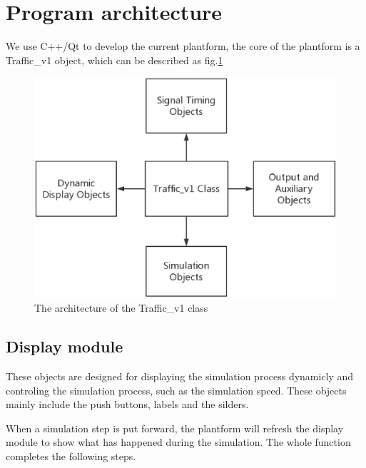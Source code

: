 \documentclass[a4paper]{paper}
\begin{document}
\section{Program architecture}
We use C++/Qt to develop the current plantform, the core of the plantform is a Traffic\_v1 object, which can be described as fig.\ref{UML}

\begin{figure}
\centering
\includegraphics[width=\textwidth]{Diagram.eps}
\caption{The architecture of the Traffic\_v1 class}
\label{UML}
\end{figure}

\subsection{Display module}
These objects are designed for displaying the simulation process dynamicly and controling the simulation process, such as the simulation speed. These objects mainly include the push buttons, labels and the silders.

When a simulation step is put forward, the plantform will refresh the display module to show what has happened during the simulation. The whole function completes the following steps.
\end{document}
